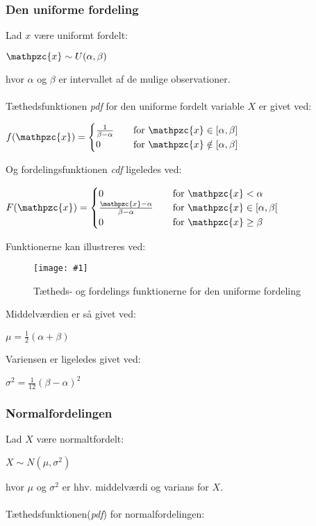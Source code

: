 \documentclass{article}
\newcommand{\mellemrum}{\vspace{2 ex}}
\newcommand{\pic}[3]{\begin{figure}[H]
		\centering
		\texttt{[image: \#1]}
		
		\caption{#2}
\end{figure}}
\newcommand{\cent}[1]{ \mellemrum \begin{center} #1\end{center} \mellemrum }
\newcommand{\stack}[1]{
	\begin{cases}
		#1
	\end{cases}}
\newcommand{\script}[1]{\mathpzc{#1}}
\begin{document}
	\subsubsection{Den uniforme fordeling}
	
	Lad $x$ være uniformt fordelt:
	
	\cent{$ \script{x} \sim U(\alpha,\beta)$}
	
	hvor $\alpha$ og $\beta$ er intervallet af de mulige observationer.\\\\
	
	Tæthedsfunktionen \textit{pdf} for den uniforme fordelt variable $X$ er givet ved:
	
	\cent{$ f(\script{x}) = \stack{\frac{1}{\beta - \alpha} & \quad \text{for } \script{x} \in [\alpha,\beta] \\ 0 & \quad \text{for } \script{x} \notin [\alpha,\beta]} $}
	
	Og fordelingsfunktionen \textit{cdf} ligeledes ved:
	
	\cent{$ F(\script{x}) = \stack{ 0 & \quad \text{for } \script{x} < \alpha \\ \frac{\script{x} - \alpha}{\beta - \alpha} & \quad \text{for } \script{x} \in [\alpha,\beta[ \\ 0 & \quad \text{for } \script{x} \geq \beta} $}
	
	Funktionerne kan illustreres ved:
	
	\pic{UniformPlot.jpg}{Tætheds- og fordelings funktionerne for den uniforme fordeling }{200px}
	
	Middelværdien er så givet ved:
	
	\cent{$ \mu = \frac{1}{2} (\alpha + \beta) $}
	
	Variensen er ligeledes givet ved:
	
	\cent{$ \sigma^2 = \frac{1}{12} (\beta-\alpha)^2 $}
	
	\subsubsection{Normalfordelingen}
	
	Lad $X$ være normaltfordelt:
	
	\cent{$ X \sim N(\mu,\sigma^2) $}
	
	hvor $\mu$ og $\sigma^2$ er hhv. middelværdi og varians for $X$.\\\\
	
	Tæthedsfunktionen(\textit{pdf})  for normalfordelingen:
	
\end{document}
